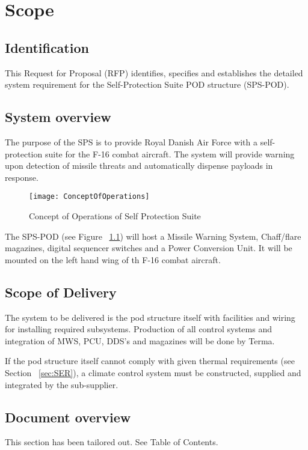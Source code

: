 \documentclass[Main]{subfiles}
\begin{document}
\chapter{Scope}

\section{Identification}
This Request for Proposal (RFP) identifies, specifies and establishes the detailed system requirement for the Self-Protection Suite POD structure (SPS-POD).

\section{System overview}
The purpose of the SPS is to provide Royal Danish Air Force with a self-protection suite for the F-16 combat aircraft. 
The system will provide warning upon detection of missile threats and automatically dispense payloads in response.

\begin{figure}[H]
\centering
\texttt{[image: ConceptOfOperations]}
\caption{Concept of Operations of Self Protection Suite}
\label{fig:conOps}
\end{figure}

The SPS-POD (see Figure ~\ref{fig:conOps}) will host a Missile Warning System, Chaff/flare magazines, digital sequencer switches and a Power Conversion Unit. 
It will be mounted on the left hand wing of th F-16 combat aircraft.

\section{Scope of Delivery}
The system to be delivered is the pod structure itself with facilities and wiring for installing required subsystems. 
Production of all control systems and integration of MWS, PCU, DDS's and magazines will be done by Terma.

If the pod structure itself cannot comply with given thermal requirements (see Section ~\ref{sec:SER}), a climate control system must be constructed, supplied and integrated by the sub-supplier.

\section{Document overview}
This section has been tailored out. See Table of Contents.


\end{document}
